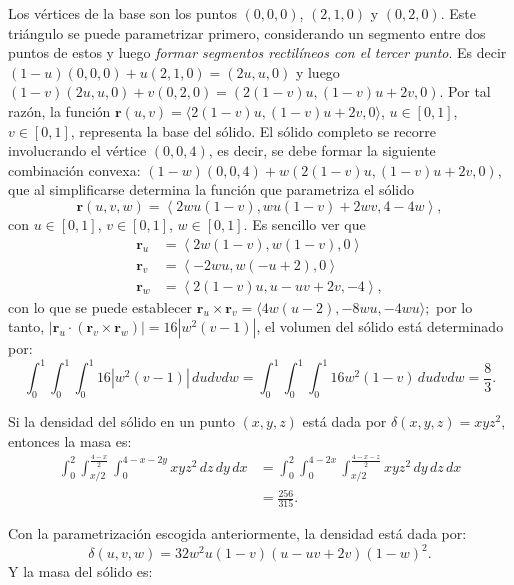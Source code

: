 Los vértices de la base son los puntos $(0,0,0)$, $(2,1,0)$ y $(0,2,0)$. Este triángulo se puede parametrizar primero, considerando un segmento entre dos puntos de estos y luego \emph{formar segmentos rectilíneos con el tercer punto}. Es decir $(1-u)(0,0,0) + u(2,1,0) = (2u, u, 0)$ y luego $(1-v)(2u, u, 0) + v(0,2,0) = (2(1-v)u, (1-v)u + 2v, 0)$. Por tal razón, la función $\mathbf{r}(u, v) = \langle 2(1-v)u, (1-v)u + 2v, 0 \rangle$, $u \in [0,1]$, $v \in [0,1]$, representa la base del sólido. El sólido completo se recorre involucrando el vértice $(0,0,4)$, es decir, se debe formar la siguiente combinación convexa: $(1-w)(0,0,4) + w(2(1-v)u, (1-v)u + 2v, 0)$, que al simplificarse determina la función que parametriza el sólido
\[ \mathbf{r}(u,v,w) = \left\langle 2wu(1-v), wu(1-v)+2wv, 4-4w \right\rangle, \]
con $u \in [0,1]$, $v \in [0,1]$, $w \in [0,1]$. Es sencillo ver que
\begin{align*}
  \mathbf{r}_u &= \left\langle 2w(1-v), w(1-v), 0 \right\rangle \\
  \mathbf{r}_v &= \left\langle -2wu, w(-u+2), 0 \right\rangle \\
  \mathbf{r}_w &= \left\langle 2(1-v)u, u-uv+2v, -4 \right\rangle,
\end{align*}
con lo que se puede establecer $\mathbf{r}_u \times \mathbf{r}_v = \langle 4w(u-2), -8wu, -4wu \rangle;$ por lo tanto, $|\mathbf{r}_u \cdot (\mathbf{r}_v \times \mathbf{r}_w)| = 16|w^2(v-1)|$, el volumen del sólido está determinado por:
\[ \int_{0}^{1}\int_{0}^{1}\int_{0}^{1} 16|w^2(v-1)|\, dudvdw = \int_{0}^{1}\int_{0}^{1}\int_{0}^{1} 16w^2(1-v)\, dudvdw = \frac{8}{3}. \]

Si la densidad del sólido en un punto $(x,y,z)$ está dada por $\delta(x,y,z) = xyz^{2}$, entonces la masa es:
\begin{align*}
  \int_{0}^{2} \int_{x/2}^{\frac{4-x}{2}} \int_{0}^{4 - x - 2y} xyz^{2} \, dz \, dy \, dx
  &= \int_{0}^{2} \int_{0}^{4 - 2x} \int_{x/2}^{\frac{4 - x - z}{2}} xyz^{2} \, dy \, dz \, dx \\
  &= \frac{256}{315}.
\end{align*}

Con la parametrización escogida anteriormente, la densidad está dada por:
\[
  \delta(u,v,w) = 32w^{2}u(1-v)(u - uv + 2v)(1 - w)^{2}.
\]
Y la masa del sólido es:
\begin{center} %
\end{center}

